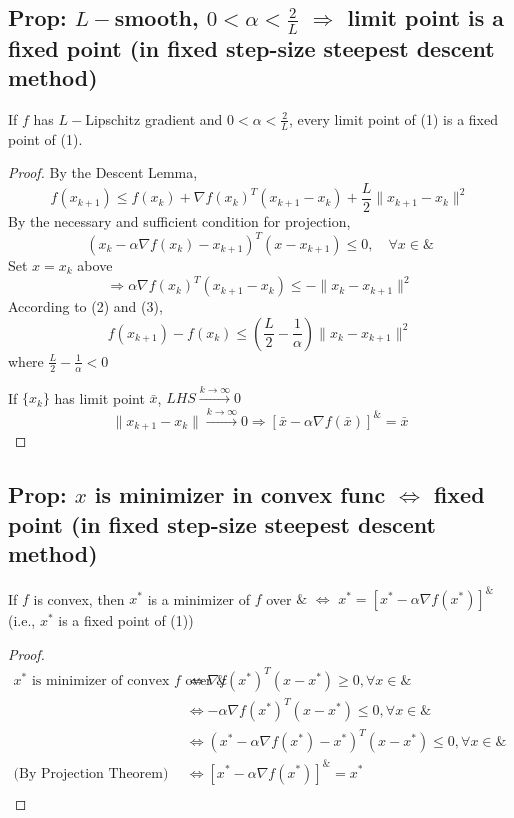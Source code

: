 \documentclass[11pt]{elegantbook}
\begin{document}
\subsection{Prop: $L-$smooth, $0<\alpha<\frac{2}{L}$ $\Rightarrow$ limit point is a fixed point (in fixed step-size steepest descent method)}
\begin{proposition}
    If $f$ has $L-$Lipschitz gradient and $0<\alpha<\frac{2}{L}$, every limit point of (1) is a fixed point of (1).
\end{proposition}
\begin{proof}
By the Descent Lemma,
\begin{equation}
    f(x_{k+1})\leq f(x_k)+\nabla f(x_k)^T(x_{k+1}-x_k)+\frac{L}{2}\|x_{k+1}-x_k\|^2
\end{equation}
By the necessary and sufficient condition for projection,
\begin{equation}
    (x_k-\alpha \nabla f(x_k)-x_{k+1})^T(x-x_{k+1})\leq 0,\quad \forall x\in\&
    \nonumber
\end{equation}
Set $x=x_k$ above
\begin{equation}
    \Rightarrow	\alpha \nabla f(x_k)^T(x_{k+1}-x_k)\leq -\|x_k-x_{k+1}\|^2
\end{equation}
According to (2) and (3), $$f(x_{k+1})-f(x_k)\leq (\frac{L}{2}-\frac{1}{\alpha})\|x_k-x_{k+1}\|^2$$ where $\frac{L}{2}-\frac{1}{\alpha}<0$

If $\{x_k\}$ has limit point $\bar{x}$, $LHS \stackrel{k \rightarrow \infty}{\longrightarrow}0$ $$\|x_{k+1}-x_{k}\|\stackrel{k \rightarrow \infty}{\longrightarrow}0 \Rightarrow [\bar{x}-\alpha \nabla f(\bar{x})]^\&=\bar{x}$$
\end{proof}

\subsection{Prop: $x$ is minimizer in convex func $\Leftrightarrow$ fixed point (in fixed step-size steepest descent method)}
\begin{proposition}
    If $f$ is convex, then $x^*$ is a minimizer of $f$ over $\&$ $\Leftrightarrow$ $x^*=[x^*-\alpha \nabla f(x^*)]^\&$ (i.e., $x^*$ is a fixed point of (1))
\end{proposition}
\begin{proof}
    \begin{equation}
        \begin{aligned}
            \text{$x^*$ is minimizer of convex $f$ over $\&$} &\Leftrightarrow \nabla f(x^*)^T(x-x^*)\geq 0,\forall x\in \&\\
            &\Leftrightarrow -\alpha\nabla f(x^*)^T(x-x^*)\leq 0,\forall x\in \&\\
            &\Leftrightarrow (x^*-\alpha\nabla f(x^*)-x^*)^T(x-x^*)\leq 0,\forall x\in \&\\
            \text{(By Projection Theorem)}&\Leftrightarrow [x^*-\alpha\nabla f(x^*)]^\&=x^*\\
        \end{aligned}
        \nonumber
    \end{equation}
\end{proof}
\end{document}
